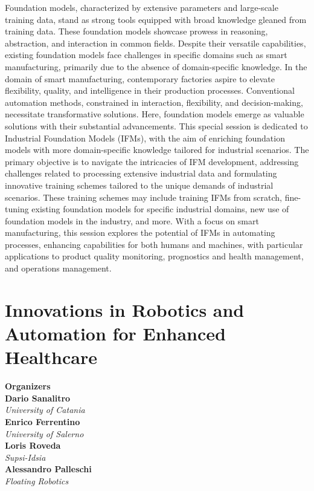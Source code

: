 Foundation models, characterized by extensive parameters and large-scale training data, stand as strong tools equipped with broad knowledge gleaned from training data. These foundation models showcase prowess in reasoning, abstraction, and interaction in common fields. Despite their versatile capabilities, existing foundation models face challenges in specific domains such as smart manufacturing, primarily due to the absence of domain-specific knowledge. In the domain of smart manufacturing, contemporary factories aspire to elevate flexibility, quality, and intelligence in their production processes. Conventional automation methods, constrained in interaction, flexibility, and decision-making, necessitate transformative solutions. Here, foundation models emerge as valuable solutions with their substantial advancements. This special session is dedicated to Industrial Foundation Models (IFMs), with the aim of enriching foundation models with more domain-specific knowledge tailored for industrial scenarios. The primary objective is to navigate the intricacies of IFM development, addressing challenges related to processing extensive industrial data and formulating innovative training schemes tailored to the unique demands of industrial scenarios. These training schemes may include training IFMs from scratch, fine-tuning existing foundation models for specific industrial domains, new use of foundation models in the industry, and more. With a focus on smart manufacturing, this session explores the potential of IFMs in automating processes, enhancing capabilities for both humans and machines, with particular applications to product quality monitoring, prognostics and health management, and operations management. 

\section{Innovations in Robotics and Automation for Enhanced Healthcare}


\large \textbf{Organizers} \normalsize \vspace{2mm} \\
\textbf{Dario  Sanalitro} \\ 
\textit{University of Catania} \vspace{{2mm}} \\
\textbf{Enrico  Ferrentino} \\ 
\textit{University of Salerno} \vspace{{2mm}} \\
\textbf{Loris  Roveda} \\ 
\textit{Supsi-Idsia} \vspace{{2mm}} \\
\textbf{Alessandro  Palleschi} \\ 
\textit{Floating Robotics}

